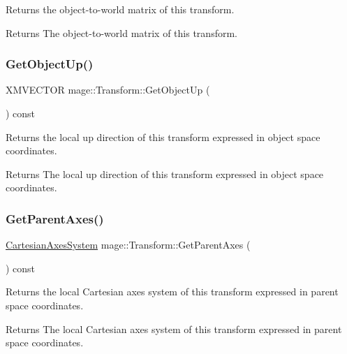 Returns the object-\/to-\/world matrix of this transform.

\begin{DoxyReturn}{Returns}
The object-\/to-\/world matrix of this transform. 
\end{DoxyReturn}
\hypertarget{structmage_1_1_transform_a68a9a599104b976b01aea39cc8ab03d2}{}\label{structmage_1_1_transform_a68a9a599104b976b01aea39cc8ab03d2} 
\subsubsection{\texorpdfstring{Get\+Object\+Up()}{GetObjectUp()}}
{\footnotesize\ttfamily X\+M\+V\+E\+C\+T\+OR mage\+::\+Transform\+::\+Get\+Object\+Up (\begin{DoxyParamCaption}{ }\end{DoxyParamCaption}) const}

Returns the local up direction of this transform expressed in object space coordinates.

\begin{DoxyReturn}{Returns}
The local up direction of this transform expressed in object space coordinates. 
\end{DoxyReturn}
\hypertarget{structmage_1_1_transform_acdd8950649ae1a779c254da82136033a}{}\label{structmage_1_1_transform_acdd8950649ae1a779c254da82136033a} 
\subsubsection{\texorpdfstring{Get\+Parent\+Axes()}{GetParentAxes()}}
{\footnotesize\ttfamily \hyperlink{structmage_1_1_cartesian_axes_system}{Cartesian\+Axes\+System} mage\+::\+Transform\+::\+Get\+Parent\+Axes (\begin{DoxyParamCaption}{ }\end{DoxyParamCaption}) const}

Returns the local Cartesian axes system of this transform expressed in parent space coordinates.

\begin{DoxyReturn}{Returns}
The local Cartesian axes system of this transform expressed in parent space coordinates. 
\end{DoxyReturn}
\hypertarget{structmage_1_1_transform_afd81bb8bef70bebc59df3ff157d53bc9}{}\label{structmage_1_1_transform_afd81bb8bef70bebc59df3ff157d53bc9} 
